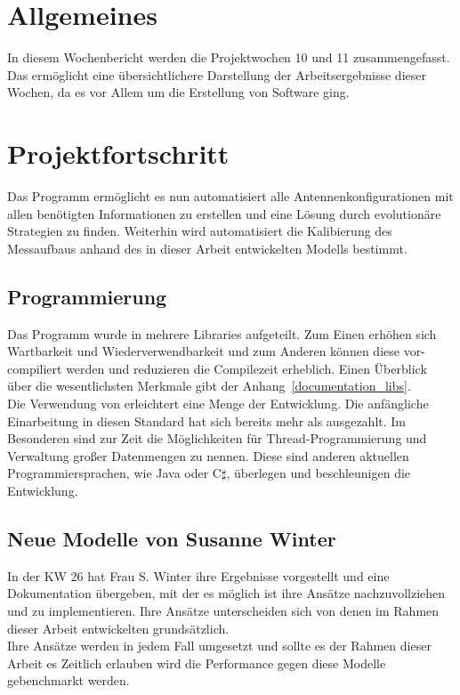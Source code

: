 \documentclass[a4paper,12pt,fleqn]{article}
\begin{document}
\setlength{\headheight}{36pt}

\begin{titlepage}



\end{titlepage}

\section[Allgemeines]{Allgemeines}
%
In diesem Wochenbericht werden die Projektwochen 10 und 11 zusammengefasst. Das ermöglicht eine übersichtlichere Darstellung der Arbeitsergebnisse dieser Wochen, da es vor Allem um die Erstellung von Software ging. 
%
\section[Fortschritt]{Projektfortschritt}
%
Das Programm ermöglicht es nun automatisiert alle Antennenkonfigurationen mit allen benötigten Informationen zu erstellen und eine Lösung durch evolutionäre Strategien zu finden. Weiterhin wird automatisiert die Kalibierung des Messaufbaus anhand des in dieser Arbeit entwickelten Modells bestimmt.

\subsection{Programmierung}
%
Das Programm wurde in mehrere Libraries aufgeteilt. Zum Einen erhöhen sich Wartbarkeit und Wiederverwendbarkeit und zum Anderen können diese vor-compiliert werden und reduzieren die Compilezeit erheblich. Einen Überblick über die wesentlichsten Merkmale gibt der Anhang~\ref{documentation_libs}.\\
Die Verwendung von  erleichtert eine Menge der Entwicklung. Die anfängliche Einarbeitung in diesen Standard hat sich bereits mehr als ausgezahlt. Im Besonderen sind zur Zeit die Möglichkeiten für Thread-Programmierung und Verwaltung großer Datenmengen zu nennen. Diese sind anderen aktuellen Programmiersprachen, wie Java oder C$\sharp$, überlegen und beschleunigen die Entwicklung.\\
%
\subsection{Neue Modelle von Susanne Winter}
%
In der KW 26 hat Frau S. Winter ihre Ergebnisse vorgestellt und eine Dokumentation übergeben, mit der es möglich ist ihre Ansätze nachzuvollziehen und zu implementieren. Ihre Ansätze unterscheiden sich von denen im Rahmen dieser Arbeit entwickelten grundsätzlich.\\
Ihre Ansätze werden in jedem Fall umgesetzt und sollte es der Rahmen dieser Arbeit es Zeitlich erlauben wird die Performance gegen diese Modelle gebenchmarkt werden.
%
\end{document}
